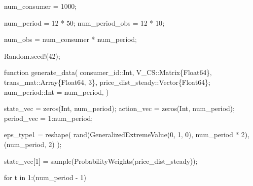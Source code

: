 \documentclass[
  letterpaper,
  DIV=11,
  numbers=noendperiod]{scrreprt}
\newenvironment{Shaded}{\begin{snugshade}}{\end{snugshade}}
\newcommand{\BuiltInTok}[1]{\textcolor[rgb]{0.00,0.23,0.31}{#1}}
\newcommand{\ControlFlowTok}[1]{\textcolor[rgb]{0.00,0.23,0.31}{#1}}
\newcommand{\DataTypeTok}[1]{\textcolor[rgb]{0.68,0.00,0.00}{#1}}
\newcommand{\FloatTok}[1]{\textcolor[rgb]{0.68,0.00,0.00}{#1}}
\newcommand{\FunctionTok}[1]{\textcolor[rgb]{0.28,0.35,0.67}{#1}}
\newcommand{\KeywordTok}[1]{\textcolor[rgb]{0.00,0.23,0.31}{#1}}
\newcommand{\NormalTok}[1]{\textcolor[rgb]{0.00,0.23,0.31}{#1}}
\newcommand{\OperatorTok}[1]{\textcolor[rgb]{0.37,0.37,0.37}{#1}}
\begin{document}
\begin{Shaded}
\begin{Highlighting}[]
\NormalTok{num\_consumer }\OperatorTok{=} \FloatTok{1000}\NormalTok{;}

\NormalTok{num\_period }\OperatorTok{=} \FloatTok{12} \OperatorTok{*} \FloatTok{50}\NormalTok{;}
\NormalTok{num\_period\_obs }\OperatorTok{=} \FloatTok{12} \OperatorTok{*} \FloatTok{10}\NormalTok{;}

\NormalTok{num\_obs }\OperatorTok{=}\NormalTok{ num\_consumer }\OperatorTok{*}\NormalTok{ num\_period;}
\end{Highlighting}
\end{Shaded}

\begin{Shaded}
\begin{Highlighting}[]
\BuiltInTok{Random}\NormalTok{.}\FunctionTok{seed!}\NormalTok{(}\FloatTok{42}\NormalTok{);}

\KeywordTok{function} \FunctionTok{generate\_data}\NormalTok{(}
\NormalTok{    consumer\_id}\OperatorTok{::}\DataTypeTok{Int}\NormalTok{,}
\NormalTok{    V\_CS}\OperatorTok{::}\DataTypeTok{Matrix\{Float64\}}\NormalTok{,}
\NormalTok{    trans\_mat}\OperatorTok{::}\DataTypeTok{Array\{Float64, 3\}}\NormalTok{,}
\NormalTok{    price\_dist\_steady}\OperatorTok{::}\DataTypeTok{Vector\{Float64\}}\NormalTok{;}
\NormalTok{    num\_period}\OperatorTok{::}\DataTypeTok{Int }\OperatorTok{=}\NormalTok{ num\_period,}
\NormalTok{)}

\NormalTok{    state\_vec }\OperatorTok{=} \FunctionTok{zeros}\NormalTok{(}\DataTypeTok{Int}\NormalTok{, num\_period);}
\NormalTok{    action\_vec }\OperatorTok{=} \FunctionTok{zeros}\NormalTok{(}\DataTypeTok{Int}\NormalTok{, num\_period);}
\NormalTok{    period\_vec }\OperatorTok{=} \FloatTok{1}\OperatorTok{:}\NormalTok{num\_period;}

\NormalTok{    eps\_type1 }\OperatorTok{=} \FunctionTok{reshape}\NormalTok{(}
        \FunctionTok{rand}\NormalTok{(}\FunctionTok{GeneralizedExtremeValue}\NormalTok{(}\FloatTok{0}\NormalTok{, }\FloatTok{1}\NormalTok{, }\FloatTok{0}\NormalTok{), num\_period }\OperatorTok{*} \FloatTok{2}\NormalTok{),}
\NormalTok{        (num\_period, }\FloatTok{2}\NormalTok{)}
\NormalTok{    );}

\NormalTok{    state\_vec[}\FloatTok{1}\NormalTok{] }\OperatorTok{=} \FunctionTok{sample}\NormalTok{(}\FunctionTok{ProbabilityWeights}\NormalTok{(price\_dist\_steady));}

    \ControlFlowTok{for}\NormalTok{ t }\KeywordTok{in} \FloatTok{1}\OperatorTok{:}\NormalTok{(num\_period }\OperatorTok{{-}} \FloatTok{1}\NormalTok{)}


\end{Highlighting}
\end{Shaded}
\end{document}

